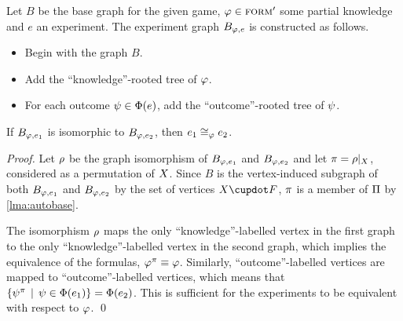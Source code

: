 Let $B$ be the base graph for the given game, $\varphi\in{\textsc{form}'}$ some partial knowledge
  and $e$ an experiment.
The experiment graph $B_{\varphi, e}$ is constructed as follows.
\begin{itemize}
\item Begin with the graph $B$.
\item Add the ``knowledge''-rooted tree of $\varphi$.
\item For each outcome $\psi\in\Phi(e)$, add the ``outcome''-rooted tree of $\psi$.
\end{itemize}

\begin{theorem} \label{thm:isoequiv}
If $B_{\varphi, e_1}$ is isomorphic to $B_{\varphi, e_2}$, then
 $e_1 \cong_{\varphi} e_2$.
\end{theorem}

\begin{proof}
Let $\rho$ be the graph isomorphism of $B_{\varphi, e_1}$ and $B_{\varphi, e_2}$ and let
  $\pi = \rho|_X$, considered as a permutation of $X$.
Since $B$ is the vertex-induced subgraph of both $B_{\varphi,e_1}$ and $B_{\varphi, e_2}$ by
  the set of vertices $\Var\cupdot F$, $\pi$ is a member of $\Pi$ by \autoref{lma:autobase}.

The isomorphism $\rho$ maps the only ``knowledge''-labelled vertex in the first graph
  to the only ``knowledge''-labelled vertex in the second graph,
  which implies the equivalence of the formulas, $\varphi^\pi \equiv \varphi$.
Similarly, ``outcome''-labelled vertices are mapped to ``outcome''-labelled vertices,
  which means that $\{\psi^\pi \:\:|\:\: \psi\in\Phi(e_1)\} = \Phi(e_2)$.
This is sufficient for the experiments to be equivalent with respect to $\varphi$.
  \qed
\end{proof}

